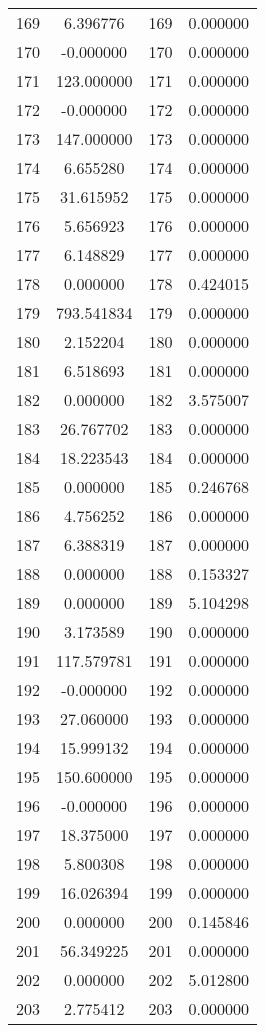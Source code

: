 \documentclass[12pt]{article}
\begin{document}
\begin{longtable}{@{}cccc@{}}
169 & 6.396776 & 169 & 0.000000 \\
170 & -0.000000 & 170 & 0.000000 \\
171 & 123.000000 & 171 & 0.000000 \\
172 & -0.000000 & 172 & 0.000000 \\
173 & 147.000000 & 173 & 0.000000 \\
174 & 6.655280 & 174 & 0.000000 \\
175 & 31.615952 & 175 & 0.000000 \\
176 & 5.656923 & 176 & 0.000000 \\
177 & 6.148829 & 177 & 0.000000 \\
178 & 0.000000 & 178 & 0.424015 \\
179 & 793.541834 & 179 & 0.000000 \\
180 & 2.152204 & 180 & 0.000000 \\
181 & 6.518693 & 181 & 0.000000 \\
182 & 0.000000 & 182 & 3.575007 \\
183 & 26.767702 & 183 & 0.000000 \\
184 & 18.223543 & 184 & 0.000000 \\
185 & 0.000000 & 185 & 0.246768 \\
186 & 4.756252 & 186 & 0.000000 \\
187 & 6.388319 & 187 & 0.000000 \\
188 & 0.000000 & 188 & 0.153327 \\
189 & 0.000000 & 189 & 5.104298 \\
190 & 3.173589 & 190 & 0.000000 \\
191 & 117.579781 & 191 & 0.000000 \\
192 & -0.000000 & 192 & 0.000000 \\
193 & 27.060000 & 193 & 0.000000 \\
194 & 15.999132 & 194 & 0.000000 \\
195 & 150.600000 & 195 & 0.000000 \\
196 & -0.000000 & 196 & 0.000000 \\
197 & 18.375000 & 197 & 0.000000 \\
198 & 5.800308 & 198 & 0.000000 \\
199 & 16.026394 & 199 & 0.000000 \\
200 & 0.000000 & 200 & 0.145846 \\
201 & 56.349225 & 201 & 0.000000 \\
202 & 0.000000 & 202 & 5.012800 \\
203 & 2.775412 & 203 & 0.000000 \\

\end{longtable}
\end{document}
